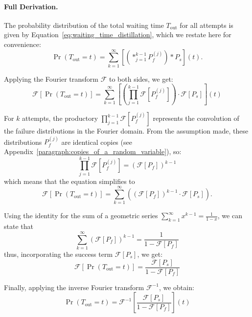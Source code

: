 \documentclass{masterthesis}
\begin{document}
\paragraph*{Full Derivation.}

The probability distribution of the total waiting time \( T_{\text{out}} \) for all attempts is given by Equation~\ref{eq:waiting_time_distillation}, which we restate here for convenience:
\begin{equation}
    \Pr(T_{\text{out}} = t) = \sum_{k=1}^{\infty} \left[ \left(\ast_{j=1}^{k-1} P_f^{(j)} \right) \ast P_s \right](t) .
\end{equation}

Applying the Fourier transform \(\mathcal{F}\) to both sides, we get:
\begin{equation}
    \mathcal{F}[\Pr(T_{\text{out}} = t)] = \sum_{k=1}^{\infty} \left[ \left(\prod_{j=1}^{k-1} \mathcal{F}[P_f^{(j)}] \right) \cdot \mathcal{F}[P_s] \right](t)
\end{equation}

For $k$ attempts, the productory \(\prod_{j=1}^{k-1} \mathcal{F}[P_f^{(j)}]\) represents the convolution of the failure distributions in the Fourier domain. From the assumption made, these distributions \( P_f^{(j)} \) are identical copies (see Appendix~\ref{paragraph:copies_of_a_random_variable}), so:
\begin{equation}
    \prod_{j=1}^{k-1} \mathcal{F}[P_f^{(j)}] = \left( \mathcal{F}[P_f] \right)^{k-1}
\end{equation}
which means that the equation simplifies to
\begin{equation}
    \mathcal{F}[\Pr(T_{\text{out}} = t)] = \sum_{k=1}^{\infty} \left( \left( \mathcal{F}[P_f] \right)^{k-1} \cdot \mathcal{F}[P_s] \right) .
\end{equation}

Using the identity for the sum of a geometric series \(\sum_{k=1}^{\infty} x^{k-1} = \frac{1}{1-x}\), we can state that
\begin{equation}
    \sum_{k=1}^{\infty} \left( \mathcal{F}[P_f] \right)^{k-1} = \frac{1}{1 - \mathcal{F}[P_f]}
\end{equation}
thus, incorporating the success term \(\mathcal{F}[P_s]\), we get:
\begin{equation}
\mathcal{F}[\Pr(T_{\text{out}} = t)] = \frac{\mathcal{F}[P_s]}{1 - \mathcal{F}[P_f]}
\end{equation}

Finally, applying the inverse Fourier transform \(\mathcal{F}^{-1}\), we obtain:
\begin{equation}
    \Pr(T_{\text{out}} = t) = \mathcal{F}^{-1} \left[ \frac{\mathcal{F}[P_s]}{1 - \mathcal{F}[P_f]} \right](t)
\end{equation}
\end{document}
